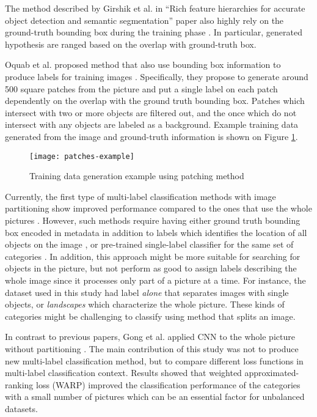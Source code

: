 The method described by Girshik et al. in ``Rich feature hierarchies for accurate object detection and semantic segmentation'' paper also highly rely on the ground-truth bounding box during the training phase \cite{Girshick2014}. In particular, generated hypothesis are ranged based on the overlap with ground-truth box.

Oquab et al. proposed method that also use bounding box information to produce labels for training images \cite{Oquab2014TransferringMidLevel}. Specifically, they propose to generate around 500 square patches from the picture and put a single label on each patch dependently on the overlap with the ground truth bounding box. Patches which intersect with two or more objects are filtered out, and the once which do not intersect with any objects are labeled as a background. Example training data generated from the image and ground-truth information is shown on Figure \ref{fig:patches-example}.

\begin{figure}
    \centering
    \texttt{[image: patches-example]}
    \caption{Training data generation example using patching method \cite{Oquab2014TransferringMidLevel}}
    \label{fig:patches-example}
\end{figure}

Currently, the first type of multi-label classification methods with image partitioning show improved performance compared to the ones that use the whole pictures \cite{Wei2016HCP, Yang2015, Ren2016}. However, such methods require having either ground truth bounding box encoded in metadata in addition to labels which identifies the location of all objects on the image \cite{Chen2015ContextualizingClassification, Dong2013Subcategory-AwareClassification}, or pre-trained single-label classifier for the same set of categories \cite{Wei2016HCP}. In addition, this approach might be more suitable for searching for objects in the picture, but not perform as good to assign labels describing the whole image since it processes only part of a picture at a time. For instance, the dataset used in this study had label \textit{alone} that separates images with single objects, or \textit{landscapes} which characterize the whole picture. These kinds of categories might be challenging to classify using method that splits an image.

In contrast to previous papers, Gong et al. applied CNN to the whole picture without partitioning \cite{Gong2013DeepRanking}. The main contribution of this study was not to produce new multi-label classification method, but to compare different loss functions in multi-label classification context. Results showed that weighted approximated-ranking loss (WARP) improved the classification performance of the categories with a small number of pictures which can be an essential factor for unbalanced datasets.

